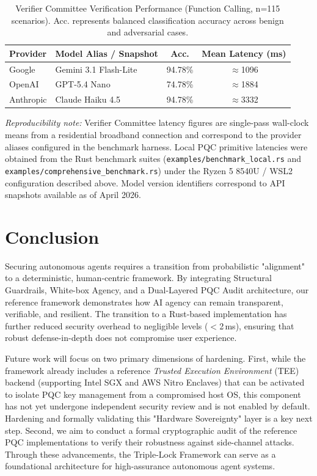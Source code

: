 \documentclass[conference]{IEEEtran}
\begin{document}
\begin{table}[htbp]
\caption{Verifier Committee Verification Performance (Function Calling, n=115 scenarios).
Acc. represents balanced classification accuracy across benign and adversarial cases.}
\begin{center}
\begin{tabularx}{\columnwidth}{|l|l|C|C|}
\hline
\textbf{Provider} & \textbf{Model Alias / Snapshot} & \textbf{Acc.} &
  \textbf{Mean Latency (ms)} \\
\hline
Google    & Gemini 3.1 Flash-Lite & 94.78\% & $\approx$1096 \\
OpenAI    & GPT-5.4 Nano          & 74.78\% & $\approx$1884 \\
Anthropic & Claude Haiku 4.5      & 94.78\% & $\approx$3332 \\
\hline
\end{tabularx}
\label{tab:dual_llm_perf}
\end{center}
\end{table}

{\small\textit{Reproducibility note:} Verifier Committee latency figures are single-pass wall-clock means from a residential broadband connection and correspond to the provider aliases configured in the benchmark harness. Local PQC primitive latencies were obtained from the Rust benchmark suites (\texttt{examples/benchmark\_local.rs} and \texttt{examples/comprehensive\_benchmark.rs}) under the Ryzen 5 8540U / WSL2 configuration described above. Model version identifiers correspond to API snapshots available as of April 2026.}

\section{Conclusion}
Securing autonomous agents requires a transition from probabilistic "alignment" to a deterministic, human-centric framework. By integrating Structural Guardrails, White-box Agency, and a Dual-Layered PQC Audit architecture, our reference framework demonstrates how AI agency can remain transparent, verifiable, and resilient. The transition to a Rust-based implementation has further reduced security overhead to negligible levels ($<$2\,ms), ensuring that robust defense-in-depth does not compromise user experience.

Future work will focus on two primary dimensions of hardening. First, while the framework already includes a reference \textit{Trusted Execution Environment} (TEE) backend (supporting Intel SGX and AWS Nitro Enclaves) that can be activated to isolate PQC key management from a compromised host OS, this component has not yet undergone independent security review and is not enabled by default. Hardening and formally validating this "Hardware Sovereignty" layer is a key next step. Second, we aim to conduct a formal cryptographic audit of the reference PQC implementations to verify their robustness against side-channel attacks. Through these advancements, the Triple-Lock Framework can serve as a foundational architecture for high-assurance autonomous agent systems.
\end{document}
